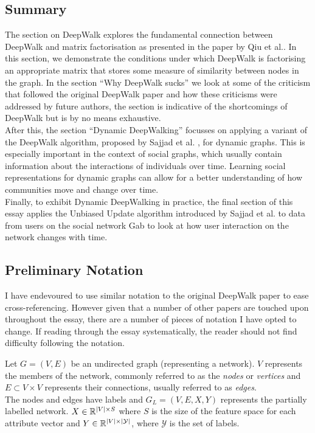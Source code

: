 \documentclass[a4paper]{article}
\begin{document}
\subsection{Summary}
The section on DeepWalk explores the fundamental connection between DeepWalk and
matrix factorisation as presented in the paper by Qiu et al.\cite{qiu2018}. In
this section, we demonstrate the conditions under which DeepWalk is factorising
an appropriate matrix that stores some measure of similarity between
nodes in the graph. In the section ``Why DeepWalk sucks'' we look at some of the
criticism that followed the original DeepWalk paper and how these criticisms
were addressed by future authors, the section is indicative of the shortcomings
of DeepWalk but is by no means exhaustive.\\
After this, the section ``Dynamic DeepWalking'' focusses on applying a variant of the DeepWalk algorithm, proposed
by Sajjad et al. \cite{sajjad2019}, for dynamic graphs. This is especially
important in the context of social graphs, which usually contain information
about the interactions of individuals over time. Learning social
representations for dynamic graphs can allow for a better understanding of how
communities move and change over time.\\
Finally, to exhibit Dynamic DeepWalking in practice, the final section of this
essay applies the Unbiased Update algorithm introduced by Sajjad et
al.\cite{sajjad2019} to data from users on the social network Gab to look at how
user interaction on the network changes with time. 

\subsection{Preliminary Notation}
I have endevoured to use similar notation to the original DeepWalk paper\cite{deepwalk} to ease
cross-referencing. However given that a number of other papers are touched upon
throughout the essay, there are a number of pieces of notation I have opted to change.
If reading through the essay systematically, the reader should not find
difficulty following the notation.

\begin{definition}
  Let $G = (V, E)$ be an undirected graph (representing a network). $V$ represents the
  members of the network, commonly referred to as the \textit{nodes} or \textit{vertices} and $E \subset V
  \times V$ represents their connections, usually referred to as
  \textit{edges}.\\
  The nodes and edges have labels and $G_L = (V, E, X, Y)$ represents the
  partially labelled network. $X \in \R^{|V| \times S}$ where $S$ is the size of
  the feature space for each attribute vector and $Y \in \R^{|V|
    \times|\mathcal{Y}|}$, where $\mathcal{Y}$ is the set of labels.
\end{definition}
\end{document}

